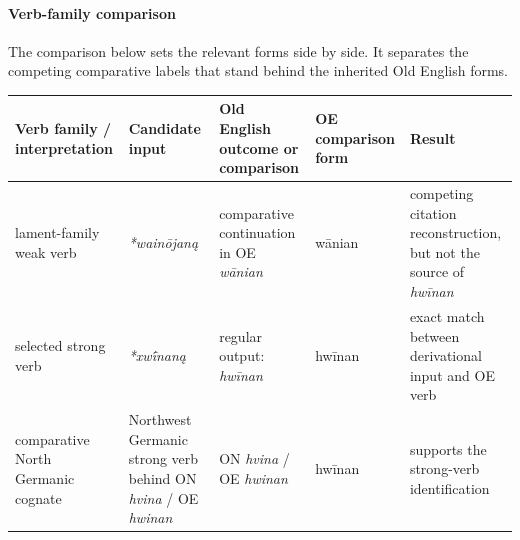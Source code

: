 \documentclass[
  british,
  a4paper,
]{article}
\newcounter{none} %
\begin{document}
\paragraph{Verb-family comparison}\label{verb-family-comparison}

The comparison below sets the relevant forms side by side. It separates
the competing comparative labels that stand behind the inherited Old
English forms.

{\def\LTcaptype{none} %
\begin{longtable}[]{@{}
  >{\raggedright\arraybackslash}p{}
  >{\raggedright\arraybackslash}p{}
  >{\raggedright\arraybackslash}p{}
  >{\raggedright\arraybackslash}p{}
  >{\raggedright\arraybackslash}p{}@{}}
\toprule\noalign{}
\begin{minipage}[b]{\linewidth}\raggedright
Verb family / interpretation
\end{minipage} & \begin{minipage}[b]{\linewidth}\raggedright
Candidate input
\end{minipage} & \begin{minipage}[b]{\linewidth}\raggedright
Old English outcome or comparison
\end{minipage} & \begin{minipage}[b]{\linewidth}\raggedright
OE comparison form
\end{minipage} & \begin{minipage}[b]{\linewidth}\raggedright
Result
\end{minipage} \\
\midrule\noalign{}
\endhead
\bottomrule\noalign{}
\endlastfoot
lament-family weak verb & \emph{*wainōjaną} & comparative continuation
in OE \emph{wānian} & wānian & competing citation reconstruction, but
not the source of \emph{hwīnan} \\
selected strong verb & \emph{*xwī́naną} & regular output: \emph{hwīnan} &
hwīnan & exact match between derivational input and OE verb \\
comparative North Germanic cognate & Northwest Germanic strong verb
behind ON \emph{hvina} / OE \emph{hwinan} & ON \emph{hvina} / OE
\emph{hwinan} & hwīnan & supports the strong-verb identification \\
\end{longtable}
}
\end{document}
